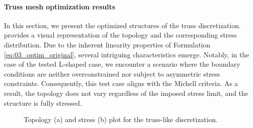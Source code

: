 \paragraph{Truss mesh optimization results}
In this section, we present the optimized structures of the truss discretization.  provides a visual representation of the topology and the corresponding stress distribution. Due to the inherent linearity properties of Formulation \ref{eq:03_optim_original}, several intriguing characteristics emerge. Notably, in the case of the tested L-shaped case, we encounter a scenario where the boundary conditions are neither overconstrained nor subject to asymmetric stress constraints. Consequently, this test case aligns with the Michell criteria. As a result, the topology does not vary regardless of the imposed stress limit, and the structure is fully stressed.
\begin{figure}
    \centering
    \hspace*{\fill}
    \hfill
    \hspace*{\fill}
    \caption{Topology (a) and stress (b) plot for the truss-like discretization.}
    \label{fig:03_L_tto}
\end{figure}
